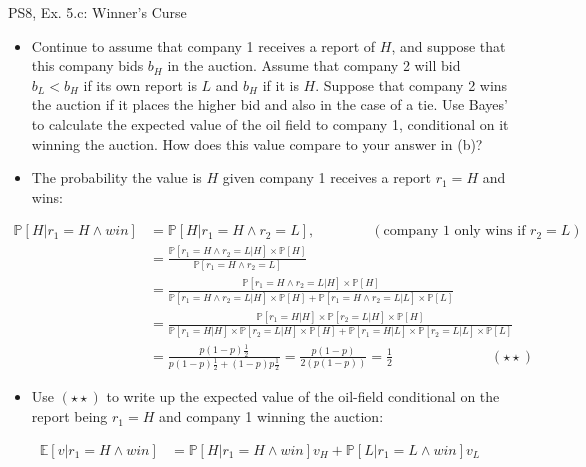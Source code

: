 \begin{frame}{PS8, Ex. 5.c: Winner's Curse}
      \begin{itemize}
        \item[(c)] Continue to assume that company 1 receives a report of $H$, and suppose that this company bids $b_H$ in the auction. Assume that company 2 will bid $b_L < b_H$ if its own report is $L$ and $b_H$ if it is $H$. Suppose that company 2 wins the auction if it places the higher bid and also in the case of a tie. Use Bayes’ to calculate the expected value of the oil field to company 1, conditional on it winning the auction. How does this value compare to your answer in (b)?
        \item[Step 1:] The probability the value is $H$ given company 1 receives a report $r_1=H$ and wins:
        \end{itemize}
        \vspace{-8pt}
        \begin{align*}
            \mathbb{P}[H|r_1=H\wedge win]&=\mathbb{P}[H|r_1=H\wedge r_2=L],\quad\quad\quad\quad(\text{company 1 only wins if }r_2=L)\\
            &=\frac{\mathbb{P}[r_1=H\wedge r_2=L|H]\times\mathbb{P}[H]}{\mathbb{P}[r_1=H\wedge r_2=L]}&\\
            &=\frac{\mathbb{P}[r_1=H\wedge r_2=L|H]\times\mathbb{P}[H]}{\mathbb{P}[r_1=H\wedge r_2=L|H]\times\mathbb{P}[H]+\mathbb{P}[r_1=H\wedge r_2=L|L]\times\mathbb{P}[L]}&\\
            &=\frac{\mathbb{P}[r_1=H|H]\times\mathbb{P}[r_2=L|H]\times\mathbb{P}[H]}{\mathbb{P}[r_1=H|H]\times\mathbb{P}[r_2=L|H]\times\mathbb{P}[H]+\mathbb{P}[r_1=H|L]\times\mathbb{P}[r_2=L|L]\times\mathbb{P}[L]}&\\
            &=\frac{p(1-p)\frac{1}{2}}{p(1-p)\frac{1}{2}+(1-p)p\frac{1}{2}}=\frac{p(1-p)}{2(p(1-p))}=\frac{1}{2}\quad\quad\quad\quad\quad\quad\quad(\star\star)
        \end{align*}
        \vspace{-8pt}
        \begin{itemize}
        \item[Step 2:] Use $(\star\star)$ to write up the expected value of the oil-field conditional on the report being $r_1=H$ and company 1 winning the auction:
      \end{itemize}
      \vspace{-4pt}
      \begin{align*}
        \mathbb{E}[v|r_1=H\wedge win]&=\mathbb{P}[H|r_1=H\wedge win]v_H+\mathbb{P}[L|r_1=L\wedge win]v_L
      \end{align*}
      \vfill\null
\end{frame}
